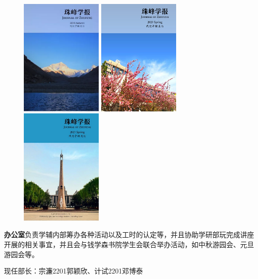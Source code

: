 \documentclass[
decoration,  %
]{qyxf-book}
\begin{document}
	\begin{figure}[htbp]
		\centering
		\begin{minipage}{4cm}
			\includegraphics[width=4cm]{pics/zf.png}
		\end{minipage}
		\begin{minipage}{4cm}
			\includegraphics[width=4cm]{pics/zf1.png}
		\end{minipage}
		\begin{minipage}{4cm}
			\includegraphics[width=4cm]{pics/zf2.png}
		\end{minipage}
	\end{figure}
	
	\textbf{办公室}负责学辅内部筹办各种活动以及工时的认定等，并且协助学研部玩完成讲座开展的相关事宜，并且会与钱学森书院学生会联合举办活动，如中秋游园会、元旦游园会等。
	
	现任部长：宗濂2201郭颖欣、计试2201邓博泰
	
\end{document}
